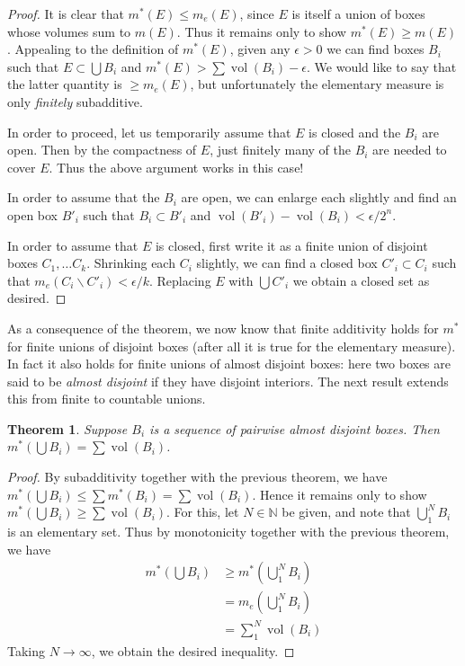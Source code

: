 \documentclass[11pt,oneside]{amsbook}
\renewcommand{\setminus}{\smallsetminus}
\newcommand{\NN}{{\mathbb N}}
\DeclareMathOperator{\vol}{vol}
\theoremstyle{definition}
\theoremstyle{plain}
\newtheorem{thm}{Theorem}[section]
\theoremstyle{definition}
\theoremstyle{remark}
\numberwithin{equation}{section}
\numberwithin{figure}{section}
\begin{document}
\begin{proof}
  It is clear that $m^*(E)\leq m_e(E)$, since $E$ is itself a union of boxes whose volumes sum to $m(E)$. Thus it remains only to show $m^*(E)\geq m(E)$. Appealing to the definition of $m^*(E)$, given any $\epsilon>0$ we can find boxes $B_i$ such that $E\subset\bigcup B_i$ and $m^*(E)>\sum\vol(B_i)-\epsilon$. We would like to say that the latter quantity is $\geq m_e(E)$, but unfortunately the elementary measure is only \emph{finitely} subadditive.

  In order to proceed, let us temporarily assume that $E$ is closed and the $B_i$ are open. Then by the compactness of $E$, just finitely many of the $B_i$ are needed to cover $E$. Thus the above argument works in this case!

  In order to assume that the $B_i$ are open, we can enlarge each slightly and find an open box $B'_i$ such that $B_i\subset B'_i$ and $\vol(B'_i)-\vol(B_i)<\epsilon/2^n$.

  In order to assume that $E$ is closed, first write it as a finite union of disjoint boxes $C_1,\ldots C_k$. Shrinking each $C_i$ slightly, we can find a closed box $C'_i\subset C_i$ such that $m_e(C_i\setminus C'_i)<\epsilon/k$. Replacing $E$ with $\bigcup C'_i$ we obtain a closed set as desired.
\end{proof}

As a consequence of the theorem, we now know that finite additivity holds for $m^*$ for finite unions of disjoint boxes (after all it is true for the elementary measure). In fact it also holds for finite unions of almost disjoint boxes: here two boxes are said to be \emph{almost disjoint} if they have disjoint interiors. The next result extends this from finite to countable unions.

\begin{thm}
  Suppose $B_i$ is a sequence of pairwise almost disjoint boxes. Then $m^*(\bigcup B_i)=\sum\vol(B_i)$.
\end{thm}

\begin{proof}
  By subadditivity together with the previous theorem, we have $m^*(\bigcup B_i)\leq\sum m^*(B_i)=\sum\vol(B_i)$. Hence it remains only to show $m^*(\bigcup B_i)\geq\sum\vol(B_i)$. For this, let $N\in\NN$ be given, and note that $\bigcup_1^NB_i$ is an elementary set. Thus by monotonicity together with the previous theorem, we have
  \begin{align*}
    m^*(\bigcup B_i)&\geq m^*(\bigcup_1^NB_i)\\
                    &=m_e(\bigcup_1^NB_i)\\
                    &=\sum_1^N\vol(B_i)
  \end{align*}
  Taking $N\to\infty$, we obtain the desired inequality.
\end{proof}
\end{document}
